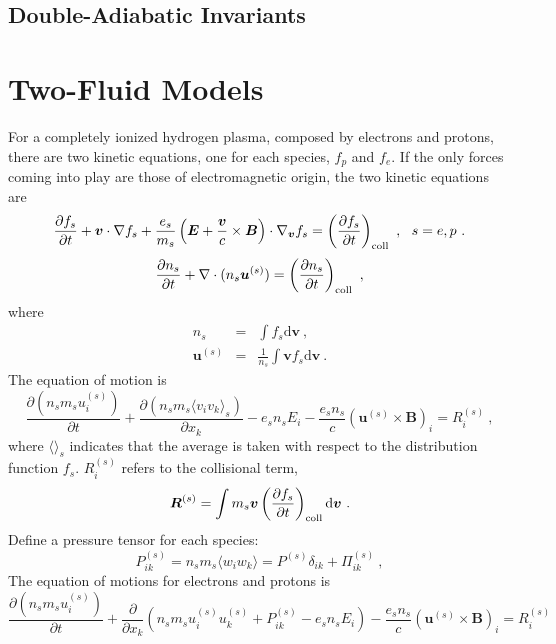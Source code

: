 \documentclass[12pt,a4paper]{article}
\renewcommand{\vec}[1]{\boldsymbol{#1}}
\newcommand{\dif}{\mathrm{d}}
\begin{document}
\subsection{Double-Adiabatic Invariants}

\section{Two-Fluid Models}
\cite{2015bps..book.....C} For a completely ionized hydrogen plasma, composed by electrons and protons, there are two kinetic equations, one for each species, $f_p$ and $f_e$. If the only forces coming into play are those of electromagnetic origin, the two kinetic equations are
\begin{equation}
\frac{\partial f_s}{\partial t} +\vec{v} \cdot \nabla f_s +\frac{e_s}{m_s} \left( \vec{E} +\frac{\vec{v}}{c} \times \vec{B}\right) \cdot \nabla_{\vec{v}} f_s = \left(\frac{\partial f_s}{\partial t} \right)_{\rm coll} ~, ~~ s = e, p ~.
\end{equation}
\begin{equation}
\frac{\partial n_s}{\partial t} +\nabla \cdot (n_s \vec{u}^{(s)}) = \left( \frac{\partial n_s}{\partial t} \right)_{\rm coll} ~,
\label{conti}
\end{equation}
where
\begin{eqnarray*}
n_s &=& \int f_s \dif \vec{v} ~,\\
\vec{u}^{(s)} &=& \frac{1}{n_s} \int \vec{v} f_s \dif \vec{v} ~.
\end{eqnarray*}
The equation of motion is
\begin{equation*}
\frac{\partial (n_s m_s u_i^{(s)} )}{\partial t} +\frac{\partial (n_s m_s \langle v_i v_k \rangle_{s} )}{\partial x_k} -e_s n_s E_i -\frac{e_s n_s}{c} (\vec{u}^{(s)} \times \vec{B})_i = R_i^{(s)} ~,
\end{equation*}
where $\langle \rangle_{s}$ indicates that the average is taken with respect to the distribution function $f_s$. $R_i^{(s)}$ refers to the collisional term,
\begin{equation*}
\vec{R}^{(s)} = \int m_s \vec{v} \left(\frac{\partial f_s}{\partial t} \right)_{\rm coll} \dif \vec{v} ~.
\end{equation*}
Define a pressure tensor for each species:
\begin{equation*}
P_{ik}^{(s)} = n_s m_s \langle w_i w_k \rangle = P^{(s)}\delta_{ik} +\Pi^{(s)}_{ik} ~,
\end{equation*}
The equation of motions for electrons and protons is
\begin{equation}
\frac{\partial (n_s m_s u_i^{(s)} )}{\partial t} +\frac{\partial}{\partial x_k} \left(n_s m_s u_i^{(s)} u_k^{(s)} +P^{(s)}_{ik} -e_s n_s E_i \right) -\frac{e_s n_s}{c} (\vec{u}^{(s)} \times \vec{B})_i = R_i^{(s)}
\label{momentum}
\end{equation}
\end{document}
